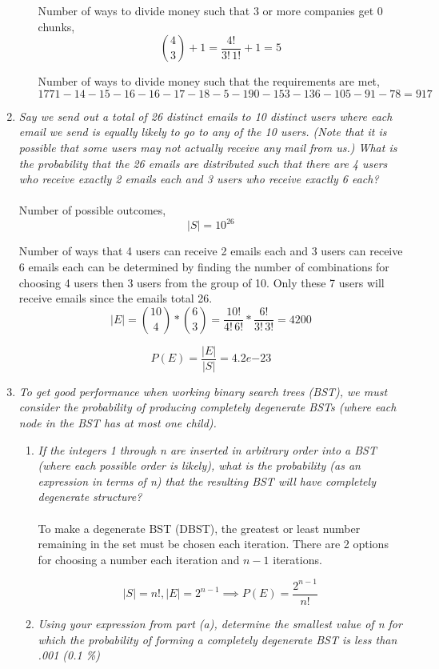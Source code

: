 \documentclass{article} %
\begin{document}
\begin{enumerate}
\begin{enumerate}
		Number of ways to divide money such that 3 or more companies get 0 chunks, $$\binom{4}{3} + 1 = \frac{4!}{3!\,1!} + 1 = 5$$ 		
		
		Number of ways to divide money such that the requirements are met, $$1771 - 14 - 15 - 16 - 16 - 17 - 18 - 5 - 190 - 153 - 136 - 105 - 91 - 78 = 917$$
	
	\end{enumerate}
	
	\item \textit{Say we send out a total of 26 distinct emails to 10 distinct users where each email we send is equally likely to go to any of the 10 users. (Note that it is possible that some users may not actually receive any mail from us.) What is the probability that the 26 emails are distributed such that there are 4 users who receive exactly 2 emails each and 3 users who receive exactly 6 each?}\\
	\\
	Number of possible outcomes, $$|S| = 10^{26}$$
	
	Number of ways that 4 users can receive 2 emails each and 3 users can receive 6 emails each can be determined by finding the number of combinations for choosing 4 users then 3 users from the group of 10. Only these 7 users will receive emails since the emails total 26. $$|E| = \binom{10}{4} * \binom{6}{3} = \frac{10!}{4!\,6!} * \frac{6!}{3!\,3!} = 4200$$
	
	$$P(E) = \frac{|E|}{|S|} = 4.2e{-23}$$
	
	\item \textit{To get good performance when working binary search trees (BST), we must consider the probability of producing completely degenerate BSTs (where each node in the BST has at most one child).}
	\begin{enumerate}
	\item \textit{If the integers 1 through n are inserted in arbitrary order into a BST (where each possible order is likely), what is the probability (as an expression in terms of n) that the resulting BST will have completely degenerate structure?}\\
	\\
	To make a degenerate BST (DBST), the greatest or least number remaining in the set must be chosen each iteration. There are 2 options for choosing a number each iteration and $n - 1$ iterations.
	
	$$|S| = n!, |E| = 2^{n - 1} \implies P(E) = \frac{2^{n - 1}}{n!}$$
	
	\item \textit{Using your expression from part (a), determine the smallest value of n for which the probability of forming a completely degenerate BST is less than .001 (0.1 \%)}
	

\end{enumerate}
\end{enumerate}
\end{document}
